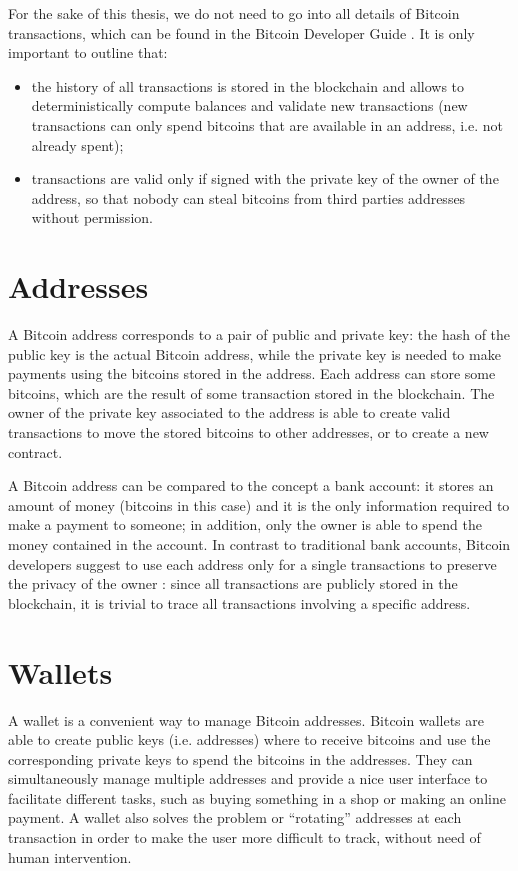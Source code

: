 For the sake of this thesis, we do not need to go into all details of Bitcoin transactions, which can be found in the Bitcoin Developer Guide \cite{bitcoin_guide}.
It is only important to outline that:
\begin{itemize}
	\item the history of all transactions is stored in the blockchain and allows to deterministically compute balances and validate new transactions (new transactions can only spend bitcoins that are available in an address, i.e. not already spent);
	\item transactions are valid only if signed with the private key of the owner of the address, so that nobody can steal bitcoins from third parties addresses without permission.
\end{itemize}

\section{Addresses}
\label{sec:addresses}
A Bitcoin address corresponds to a pair of public and private key: the hash of the public key is the actual Bitcoin address, while the private key is needed to make payments using the bitcoins stored in the address.
Each address can store some bitcoins, which are the result of some transaction stored in the blockchain.
The owner of the private key associated to the address is able to create valid transactions to move the stored bitcoins to other addresses, or to create a new contract.

A Bitcoin address can be compared to the concept a bank account:
it stores an amount of money (bitcoins in this case) and it is the only information required to make a payment to someone;
in addition, only the owner is able to spend the money contained in the account.
In contrast to traditional bank accounts, Bitcoin developers suggest to use each address only for a single transactions to preserve the privacy of the owner \cite{bitcoin_guide}:
since all transactions are publicly stored in the blockchain, it is trivial to trace all transactions involving a specific address.

\section{Wallets}
A wallet is a convenient way to manage Bitcoin addresses.
Bitcoin wallets are able to create public keys (i.e. addresses) where to receive bitcoins and use the corresponding private keys to spend the bitcoins in the addresses.
They can simultaneously manage multiple addresses and provide a nice user interface to facilitate different tasks, such as buying something in a shop or making an online payment.
A wallet also solves the problem or ``rotating'' addresses at each transaction in order to make the user more difficult to track, without need of human intervention.

